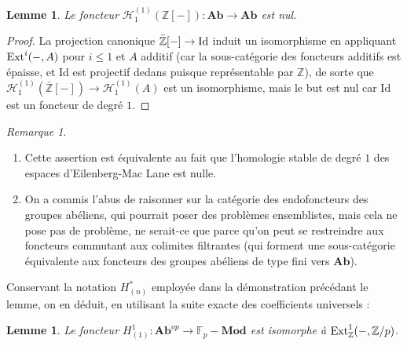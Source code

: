\documentclass[a4paper,10pt]{article}
\newcommand{\Hh}{{\mathcal{H}}}
\newtheorem{lm}[thm]{Lemme}
\theoremstyle{definition}
\theoremstyle{remark}
\newtheorem{rem}[thm]{Remarque}
\begin{document}
\begin{lm}\label{lm-eml1}
 Le foncteur $\Hh^{(1)}_1(\mathbb{Z}[-]) : \mathbf{Ab}\to\mathbf{Ab}$ est nul.
\end{lm}

\begin{proof}
 La projection canonique $\bar{\mathbb{Z}}[-]\to {\rm Id}$ induit un isomorphisme en appliquant ${\rm Ext}^i(-,A)$ pour $i\leq 1$ et $A$ additif (car la sous-catégorie des foncteurs additifs est épaisse, et Id est projectif dedans puisque représentable par $\mathbb{Z}$), de sorte que $\Hh_1^{(1)}(\bar{\mathbb{Z}}[-])\to\Hh^{(1)}_1(A)$ est un isomorphisme, mais le but est nul car Id est un foncteur de degré $1$.
\end{proof}

\begin{rem}\begin{enumerate}
            \item Cette assertion est équivalente au fait que l'homologie stable de degré $1$ des espaces d'Eilenberg-Mac Lane est nulle.
\item On a commis l'abus de raisonner sur la catégorie des endofoncteurs des groupes abéliens, qui pourrait poser des problèmes ensemblistes, mais cela ne pose pas de problème, ne serait-ce que parce qu'on peut se restreindre aux foncteurs commutant aux colimites filtrantes (qui forment une sous-catégorie équivalente aux foncteurs des groupes abéliens de type fini vers $\mathbf{Ab}$).
           \end{enumerate}
\end{rem}

Conservant la notation $H^*_{(n)}$ employée dans la démonstration précédant le lemme, on en déduit, en utilisant la suite exacte des coefficients universels :
\begin{lm}\label{lm-eml2}
 Le foncteur $H^1_{(1)} : \mathbf{Ab}^{op}\to\mathbb{F}_p-\mathbf{Mod}$ est isomorphe à ${\rm Ext}^1_\mathbb{Z}(-,\mathbb{Z}/p)$.
\end{lm}
\end{document}
